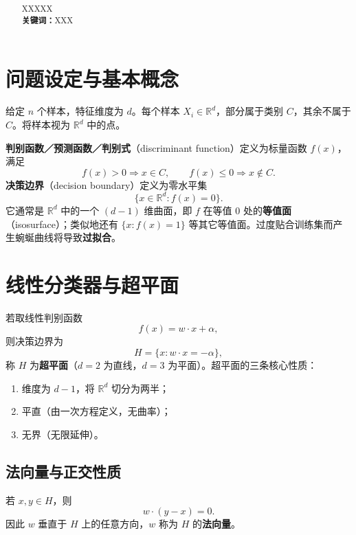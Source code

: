 \documentclass[10.5pt,hyperref,a4paper,UTF8]{ctexart}
\begin{document}
\cover

\begin{abstract}
%
XXXXX\\
\textbf{关键词：}XXX
%
\end{abstract}

\newpage
\tableofcontents
\thispagestyle{empty} %

\newpage
\setcounter{page}{1} %

\begin{center}
    \title{ \Huge \textbf{} }
\end{center}


\thispagestyle{empty} %


\section{问题设定与基本概念}
给定 $n$ 个样本，特征维度为 $d$。每个样本 $X_i\in\mathbb{R}^d$，部分属于类别 $C$，其余不属于 $C$。将样本视为 $\mathbb{R}^d$ 中的点。

\textbf{判别函数／预测函数／判别式}（discriminant function）定义为标量函数 $f(x)$，满足
\[
f(x)>0\Rightarrow x\in C,\qquad f(x)\le 0\Rightarrow x\notin C.
\]
\textbf{决策边界}（decision boundary）定义为零水平集
\[
\{x\in\mathbb{R}^d: f(x)=0\}.
\]
它通常是 $\mathbb{R}^d$ 中的一个 $(d-1)$ 维曲面，即 $f$ 在等值 $0$ 处的\textbf{等值面}（isosurface）；类似地还有 $\{x:f(x)=1\}$ 等其它等值面。过度贴合训练集而产生蜿蜒曲线将导致\textbf{过拟合}。

\section{线性分类器与超平面}
若取线性判别函数
\[
f(x)=w\cdot x+\alpha,
\]
则决策边界为
\[
H=\{x:w\cdot x=-\alpha\},
\]
称 $H$ 为\textbf{超平面}（$d{=}2$ 为直线，$d{=}3$ 为平面）。超平面的三条核心性质：
\begin{enumerate}
  \item 维度为 $d-1$，将 $\mathbb{R}^d$ 切分为两半；
  \item 平直（由一次方程定义，无曲率）；
  \item 无界（无限延伸）。
\end{enumerate}

\subsection{法向量与正交性质}
若 $x,y\in H$，则
\[
w\cdot (y-x)=0.
\]
因此 $w$ 垂直于 $H$ 上的任意方向，$w$ 称为 $H$ 的\textbf{法向量}。
\end{document}
